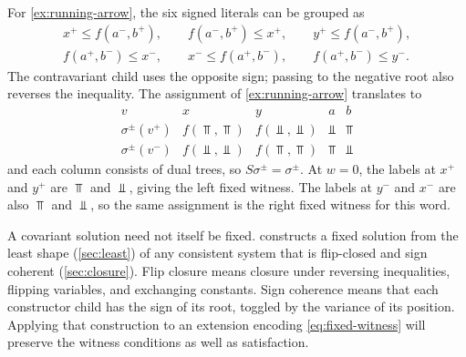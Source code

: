 \begin{example}\label{ex:running-signed}
For \cref{ex:running-arrow}, the six signed literals can be grouped as
\[
 \begin{gathered}
 x^+\le f(a^-,b^+),\qquad f(a^-,b^+)\le x^+,
 \qquad y^+\le f(a^-,b^+),\\
 f(a^+,b^-)\le x^-,\qquad x^-\le f(a^+,b^-),
 \qquad f(a^+,b^-)\le y^-.
 \end{gathered}
\]
The contravariant child uses the opposite sign; passing to the negative
root also reverses the inequality. The assignment of
\cref{ex:running-arrow} translates to
\[
\begin{array}{c|cccc}
 v&x&y&a&b\\\hline
 \sigma^{\pm}(v^+)&f(\Top,\Top)&f(\Bot,\Bot)&\Bot&\Top\\
 \sigma^{\pm}(v^-)&f(\Bot,\Bot)&f(\Top,\Top)&\Top&\Bot
\end{array}
\]
and each column consists of dual trees, so $S\sigma^{\pm}=\sigma^{\pm}$.
At $w=0$, the labels at $x^+$ and $y^+$ are $\Top$ and $\Bot$, giving the
left fixed witness. The labels at $y^-$ and $x^-$ are also $\Top$ and
$\Bot$, so the same assignment is the right fixed witness for this word.
\end{example}

A covariant solution need not itself be fixed.  constructs
a fixed solution from the least shape (\cref{sec:least}) of any consistent
system that is flip-closed and sign coherent (\cref{sec:closure}). Flip
closure means closure under reversing inequalities, flipping variables, and
exchanging constants. Sign coherence means that each constructor child has
the sign of its root, toggled by the variance of its position. Applying that
construction to an extension encoding \eqref{eq:fixed-witness} will preserve
the witness conditions as well as satisfaction.
